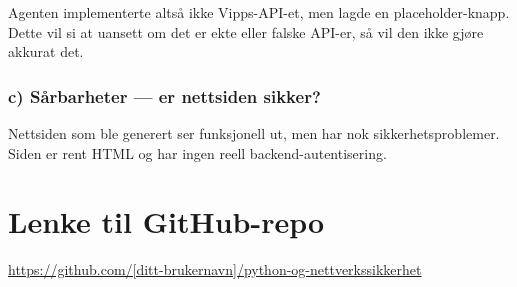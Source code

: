 \documentclass[12pt,a4paper]{article}
\begin{document}
Agenten implementerte altså ikke Vipps-API-et, men lagde en placeholder-knapp.
Dette vil si at uansett om det er ekte eller falske API-er, så vil den ikke gjøre akkurat det.

\subsubsection*{c) Sårbarheter --- er nettsiden sikker?}

Nettsiden som ble generert ser funksjonell ut, men har nok sikkerhetsproblemer. Siden er rent HTML og har ingen reell backend-autentisering.

\section*{Lenke til GitHub-repo}

\url{https://github.com/[ditt-brukernavn]/python-og-nettverkssikkerhet}
\end{document}
